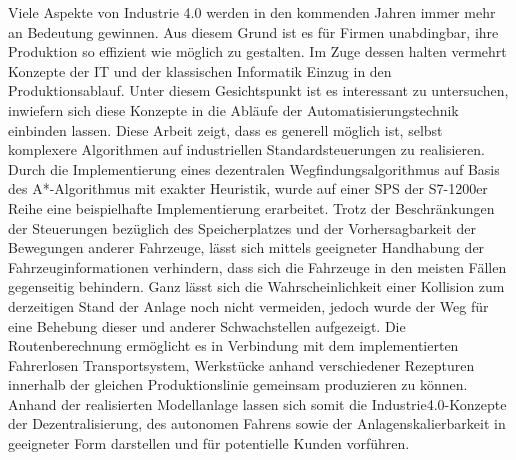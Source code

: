 	Viele Aspekte von Industrie 4.0 werden in den kommenden Jahren immer mehr an Bedeutung gewinnen. Aus diesem Grund ist es für Firmen unabdingbar, ihre Produktion so effizient wie möglich zu gestalten. Im Zuge dessen halten vermehrt Konzepte der IT und der klassischen Informatik Einzug in den Produktionsablauf. Unter diesem Gesichtspunkt ist es interessant zu untersuchen, inwiefern sich diese Konzepte in die Abläufe der Automatisierungstechnik einbinden lassen. Diese Arbeit zeigt, dass es generell möglich ist, selbst komplexere Algorithmen auf industriellen Standardsteuerungen zu realisieren. Durch die Implementierung eines dezentralen Wegfindungsalgorithmus auf Basis des A*-Algorithmus mit exakter Heuristik, wurde auf einer \ac{SPS} der S7-1200er Reihe eine beispielhafte Implementierung erarbeitet. Trotz der Beschränkungen der Steuerungen bezüglich des Speicherplatzes und der Vorhersagbarkeit der Bewegungen anderer Fahrzeuge, lässt sich mittels geeigneter Handhabung der Fahrzeuginformationen verhindern, dass sich die Fahrzeuge in den meisten Fällen gegenseitig behindern. Ganz lässt sich die Wahrscheinlichkeit einer Kollision zum derzeitigen Stand der Anlage noch nicht vermeiden, jedoch wurde der Weg für eine Behebung dieser und anderer Schwachstellen aufgezeigt. Die Routenberechnung ermöglicht es in Verbindung mit dem implementierten Fahrerlosen Transportsystem, Werkstücke anhand verschiedener Rezepturen innerhalb der gleichen Produktionslinie gemeinsam produzieren zu können. Anhand der realisierten Modellanlage lassen sich somit die Industrie4.0-Konzepte der Dezentralisierung, des autonomen Fahrens sowie der Anlagenskalierbarkeit in geeigneter Form darstellen und für potentielle Kunden vorführen.
	
	